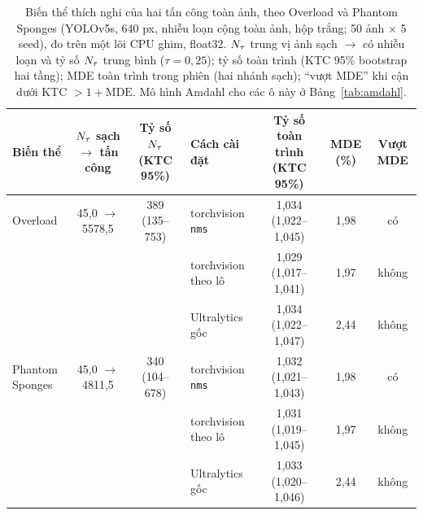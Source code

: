 \begin{table}[t]
\centering\small
\caption{Biến thể thích nghi của hai tấn công toàn ảnh, theo Overload và Phantom Sponges (YOLOv5s, 640 px, nhiễu loạn cộng toàn ảnh, hộp trắng; 50 ảnh $\times$ 5 seed), đo trên một lõi CPU ghim, float32. $N_{\tau}$ trung vị ảnh sạch $\to$ có nhiễu loạn và tỷ số $N_{\tau}$ trung bình ($\tau=0{,}25$); tỷ số toàn trình (KTC 95\% bootstrap hai tầng); MDE toàn trình trong phiên (hai nhánh sạch); ``vượt MDE'' khi cận dưới KTC $>1+\mathrm{MDE}$. Mô hình Amdahl cho các ô này ở Bảng~\ref{tab:amdahl}.}
\label{tab:attacks}
\begin{tabular}{@{}lcclccc@{}}
\toprule
Biến thể & $N_{\tau}$ sạch $\to$ tấn công & Tỷ số $N_{\tau}$ (KTC 95\%) & Cách cài đặt & Tỷ số toàn trình (KTC 95\%) & MDE (\%) & Vượt MDE \\
\midrule
Overload & 45,0 $\to$ 5578,5 & 389 (135--753) & torchvision \texttt{nms} & 1,034 (1,022--1,045) & 1,98 & có \\
 & &  & torchvision theo lô & 1,029 (1,017--1,041) & 1,97 & không \\
 & &  & Ultralytics gốc & 1,034 (1,022--1,047) & 2,44 & không \\
Phantom Sponges & 45,0 $\to$ 4811,5 & 340 (104--678) & torchvision \texttt{nms} & 1,032 (1,021--1,043) & 1,98 & có \\
 & &  & torchvision theo lô & 1,031 (1,019--1,045) & 1,97 & không \\
 & &  & Ultralytics gốc & 1,033 (1,020--1,046) & 2,44 & không \\
\bottomrule
\end{tabular}
\end{table}
